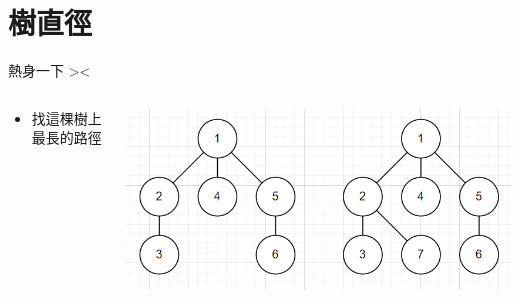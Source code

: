 \documentclass[aspectratio=169]{beamer}
\begin{document}
    \section{樹直徑}
    \begin{frame}{熱身一下 ><}
        \begin{columns}
            \begin{column}{0.45\textwidth}
                \begin{itemize}
                    \item 找這棵樹上最長的路徑
                \end{itemize}
            \end{column}
            \begin{column}{0.5\textwidth}
                \includegraphics[width=\textwidth]{images/tree_ready.png}
            \end{column}
        \end{columns}
    \end{frame}
\end{document}
